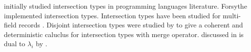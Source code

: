 \cite{} initially studied intersection types in programming languages literature.
Forsythe \cite{} implemented intersection types. Intersection types have been studied for
multi-field records \cite{}. 
Disjoint intersection types were studied by \citet{oliveira2016disjoint} to give a coherent
and deterministic caluclus for intersection types with merge operator. \cal discussed in 
is dual to $\lambda_{i}$ by \citet{oliveira2016disjoint}.

